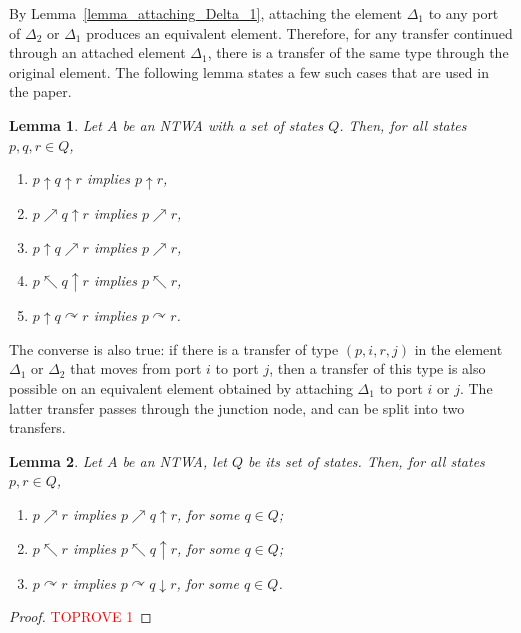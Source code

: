 \documentclass[12pt,a4paper]{article}
\newtheorem{lemma}{Lemma}
\theoremstyle{definition}
\begin{document}
By Lemma~\ref{lemma_attaching_Delta_1}, attaching the element $\Delta_1$
to any port of $\Delta_2$ or $\Delta_1$
produces an equivalent element.
Therefore, for any transfer continued through an attached element $\Delta_1$,
there is a transfer of the same type through the original element.
The following lemma states a few such cases that are used in the paper.

\begin{lemma} \label{lemma_swallowing_delta_1}
Let $A$ be an NTWA with a set of states $Q$.
Then, for all states $p,q,r \in Q$,
\begin{enumerate}\renewcommand{\theenumi}{\alph{enumi}}
	\renewcommand{\labelenumi}{(\alph{enumi})}
\item	\label{lemma_swallowing_delta_1__p_up_q_up_r__p_up_r}
	$p \uparrow q \uparrow r$ implies $p \uparrow r$,
\item	\label{lemma_swallowing_delta_1__p_ne_q_up_r__p_ne_r}
	$p \nearrow q \uparrow r$ implies $p \nearrow r$,
\item	\label{lemma_swallowing_delta_1__p_up_q_ne_r__p_ne_r}
	$p \uparrow q \nearrow r$ implies $p \nearrow r$,
\item	\label{lemma_swallowing_delta_1__p_nw_q_up_r__p_nw_r}
	$p \nwarrow q \uparrow r$ implies $p \nwarrow r$,
\item	\label{lemma_swallowing_delta_1__p_up_q_right_r__p_right_r}
	$p \uparrow q \curvearrowright r$ implies $p \curvearrowright r$.
\end{enumerate}
\end{lemma}

The converse is also true:
if there is a transfer of type $(p,i,r,j)$ in the element $\Delta_1$
or $\Delta_2$ that moves from port $i$ to port $j$,
then a transfer of this type is also possible on an equivalent element
obtained by attaching $\Delta_1$ to port $i$ or $j$.
The latter transfer passes through the junction node,
and can be split into two transfers.

\begin{lemma} \label{lemma_inserting_delta_1}
Let $A$ be an NTWA, let $Q$ be its set of states.
Then, for all states $p,r \in Q$,
\begin{enumerate}\renewcommand{\theenumi}{\alph{enumi}}
	\renewcommand{\labelenumi}{(\alph{enumi})}
\item \label{lemma_inserting_delta_1_p_nearrow_q}
	$p \nearrow r$ implies $p \nearrow q \uparrow r$, for some $q \in Q$;
\item \label{lemma_inserting_delta_1_p_nwarrow_q}	
	$p \nwarrow r$ implies $p \nwarrow q \uparrow r$, for some $q \in Q$;
\item \label{lemma_inserting_delta_1_p_curvearrowright_q}	
$p \curvearrowright r$ implies $p\curvearrowright q \downarrow r$, for some $q \in Q$.
\end{enumerate}
\end{lemma}
\begin{proof}\textcolor{red}{TOPROVE 1}\end{proof}
\end{document}
